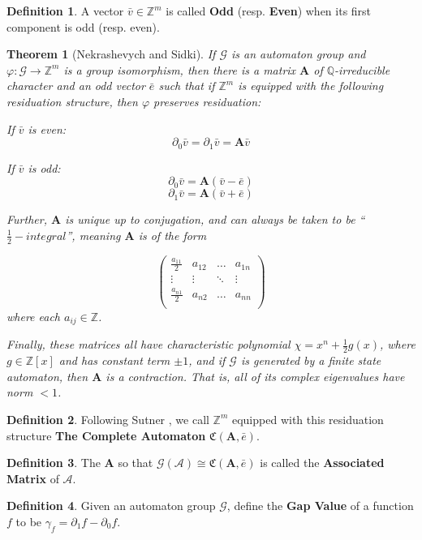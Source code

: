 \documentclass{article}
\newcommand{\A}{\mathcal{A}}
\newcommand{\G}{\mathcal{G}}
\newcommand{\C}{\mathfrak{C}(\Am,\e)}
\newcommand{\Z}{\mathbb{Z}}
\newcommand{\Q}{\mathbb{Q}}
\newcommand{\2}{\textbf{2}}
\newcommand{\Am}{\textbf{A}}
\newcommand{\del}{\partial}
\newcommand{\vv}{\bar{v}}
\newcommand{\e}{\bar{e}}
\newtheorem{thm}{Theorem}
\theoremstyle{definition}
\newtheorem{defn}{Definition}
\begin{document}
\begin{defn}
  A vector $\vv \in \Z^m$ is called \textbf{Odd} (resp. \textbf{Even}) 
  when its first component is odd (resp. even). 
\end{defn}

\begin{thm}[Nekrashevych and Sidki]
  If $\G$ is an automaton group and $\varphi : \G \to \Z^m$ is a group 
  isomorphism, then there is a matrix $\Am$ of $\Q$-irreducible character
  and an odd vector $\e$ such that if $\Z^m$ is equipped with the following 
  residuation structure, then $\varphi$ preserves residuation:

  If $\vv$ is even:
  \[ \del_0 \vv = \del_1 \vv = \Am \vv \]

  If $\vv$ is odd:
  \[ \del_0 \vv = \Am (\vv - \e) \]
  \[ \del_1 \vv = \Am (\vv + \e) \]

  Further, $\Am$ is unique up to conjugation, and can always be taken to be 
  ``$\frac{1}{2}-integral$'', meaning $\Am$ is of the form 

  \[
  \begin{pmatrix}
    \frac{a_{11}}{2} & a_{12} & \dots  & a_{1n}\\
    \vdots           & \vdots & \ddots & \vdots\\
    \frac{a_{n1}}{2} & a_{n2} & \dots  & a_{nn}\\
  \end{pmatrix}
  \]
  where each $a_{ij} \in \Z$.

  Finally, these matrices all have characteristic polynomial
  $\chi = x^n + \frac{1}{2}g(x)$, where $g \in \Z[x]$ and has constant term 
  $\pm 1$, and if $\G$ is generated by a finite state automaton, then 
  $\Am$ is a contraction. That is, all of its complex eigenvalues have
  norm $<1$.
\end{thm}

\begin{defn}
  Following Sutner \cite{Sutner18:abelian_automata}, we call $\Z^m$ equipped
  with this residuation structure \textbf{The Complete Automaton} $\C$. 
\end{defn}

\begin{defn}
  The $\Am$ so that $\G(\A) \cong \C$ is called the 
  \textbf{Associated Matrix} of $\A$.
\end{defn}

\begin{defn}
  Given an automaton group $\G$, define the \textbf{Gap Value} of a function 
  $f$ to be $\gamma_f = \del_1 f - \del_0 f$.
\end{defn}
\end{document}
